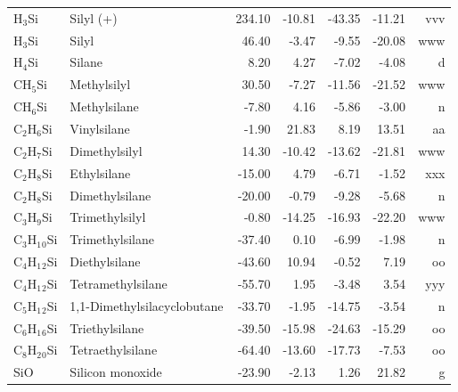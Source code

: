 \begin{table}
\begin{center}
\begin{tabular}{llrrrrr}
 H$_3$Si        & Silyl (+)                              &   234.10    &   -10.81  &   -43.35  &   -11.21  &    vvv\\
 H$_3$Si        & Silyl                                  &    46.40    &    -3.47  &    -9.55  &   -20.08  &    www\\
 H$_4$Si        & Silane                                 &     8.20    &     4.27  &    -7.02  &    -4.08  &      d\\
 CH$_5$Si       & Methylsilyl                            &    30.50    &    -7.27  &   -11.56  &   -21.52  &    www\\
 CH$_6$Si       & Methylsilane                           &    -7.80    &     4.16  &    -5.86  &    -3.00  &      n\\
 C$_2$H$_6$Si      & Vinylsilane                            &    -1.90    &    21.83  &     8.19  &    13.51  &     aa\\
 C$_2$H$_7$Si      & Dimethylsilyl                          &    14.30    &   -10.42  &   -13.62  &   -21.81  &    www\\
 C$_2$H$_8$Si      & Ethylsilane                            &   -15.00    &     4.79  &    -6.71  &    -1.52  &    xxx\\
 C$_2$H$_8$Si      & Dimethylsilane                         &   -20.00    &    -0.79  &    -9.28  &    -5.68  &      n\\
 C$_3$H$_9$Si      & Trimethylsilyl                         &    -0.80    &   -14.25  &   -16.93  &   -22.20  &    www\\
 C$_3$H$_1$$_0$Si     & Trimethylsilane                        &   -37.40    &     0.10  &    -6.99  &    -1.98  &      n\\
 C$_4$H$_1$$_2$Si     & Diethylsilane                          &   -43.60    &    10.94  &    -0.52  &     7.19  &     oo\\
 C$_4$H$_1$$_2$Si     & Tetramethylsilane                      &   -55.70    &     1.95  &    -3.48  &     3.54  &    yyy\\
 C$_5$H$_1$$_2$Si     & 1,1-Dimethylsilacyclobutane            &   -33.70    &    -1.95  &   -14.75  &    -3.54  &      n\\
 C$_6$H$_1$$_6$Si     & Triethylsilane                         &   -39.50    &   -15.98  &   -24.63  &   -15.29  &     oo\\
 C$_8$H$_2$$_0$Si     & Tetraethylsilane                       &   -64.40    &   -13.60  &   -17.73  &    -7.53  &     oo\\
 SiO         & Silicon monoxide                       &   -23.90    &    -2.13  &     1.26  &    21.82  &      g\\

\end{tabular}
\end{center}
\end{table}
